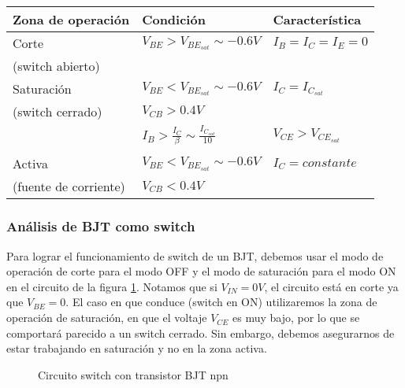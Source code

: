 \documentclass[11pt,fancy,lang=es]{elegantbook}
\begin{document}
\begin{table}[!h]
    \centering
    \begin{tabular}{|l|l|l|}
        Zona de operación     & Condición                                           & Característica        \\\hline
        Corte                 & $V_{BE}>V_{BE_{sat}}\sim-0.6V$                      & $I_B=I_C=I_E=0$       \\
        (switch abierto)      &                                                     &                       \\\hline
        Saturación            & $V_{BE}<V_{BE_{sat}}\sim-0.6V$                      & $I_C= I_{C_{sat}}$    \\
        (switch cerrado)      & $V_{CB}>0.4V$                                       &                       \\
                              & $I_B>\frac{I_C}{\beta} \sim \frac{I_{C_{sat}}}{10}$ & $V_{CE}>V_{CE_{sat}}$ \\
                              &                                                     &                       \\ \hline
        Activa                & $V_{BE}<V_{BE_{sat}}\sim-0.6V$                      & $I_C= constante$      \\
        (fuente de corriente) & $V_{CB}<0.4V$                                       &                       \\
    \end{tabular}
\end{table}


\subsubsection{Análisis de BJT como switch}
Para lograr el funcionamiento de switch de un BJT, debemos usar el modo de operación de corte para el modo OFF y el modo de saturación para el modo ON en el circuito de la figura  \ref{fig:switchBJT}. Notamos que si $V_{IN}=0V$, el circuito está en corte ya que $V_{BE}=0$. El caso en que conduce (switch en ON) utilizaremos la zona de operación de saturación, en que el voltaje $V_{CE}$ es muy bajo, por lo que se comportará parecido a un switch cerrado. Sin embargo, debemos asegurarnos de estar trabajando en saturación y no en la zona activa.

\begin{figure}[!h]
    \centering
    \caption{Circuito switch con transistor BJT npn}
    \label{fig:switchBJT}
\end{figure}
\end{document}
